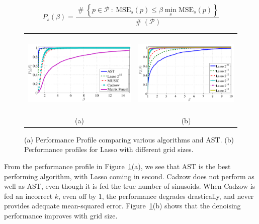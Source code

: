 \begin{equation*}
P_s(\beta) = \frac{\mathop{\#}\left\{p \in \mathcal{P} ~:~ \mathrm{MSE}_s(p) \leq \beta \min_s \mathrm{MSE}_s(p)\right\}}{\mathop{\#}(\mathcal{P})}
\end{equation*}

\begin{figure}[htp]
\centering
\begin{tabular}{cc}
	\includegraphics[height=40mm]{figures/performance_profile_randamp_color} &
	\includegraphics[trim=0mm 0mm 2mm 5mm,clip,height=40mm]{figures/performance_profile_lasso_randamp_color}\\
(a) & (b)
\end{tabular}
\caption{ (a) Performance Profile  comparing various algorithms and AST. (b) Performance profiles for Lasso with different grid sizes.}
\label{fig:pp}
\end{figure}


From the performance profile in Figure~\ref{fig:pp}(a), we see that AST is the
best performing algorithm, with Lasso coming in
second. Cadzow does not perform as well as AST, even though it is fed the true
number of sinusoids. When Cadzow is fed an incorrect $k$, even off by $1$, the
performance degrades drastically, and never provides adequate mean-squared
error. Figure~\ref{fig:pp}(b) shows that the denoising performance
improves  with grid size.

